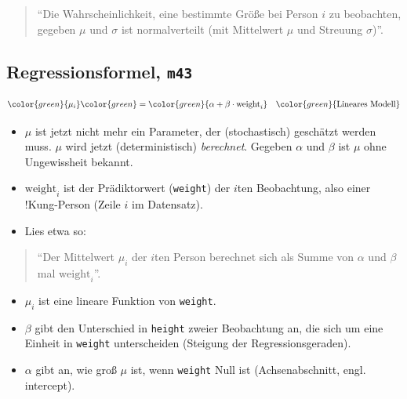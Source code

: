 \documentclass[
  a4paper,
  DIV=11]{scrreprt}
\providecommand{\tightlist}{%
  \setlength{\itemsep}{0pt}\setlength{\parskip}{0pt}}\usepackage{longtable,booktabs,array}
\theoremstyle{definition}
\theoremstyle{remark}
\begin{document}
\begin{quote}
``Die Wahrscheinlichkeit, eine bestimmte Größe bei Person \(i\) zu
beobachten, gegeben \(\mu\) und \(\sigma\) ist normalverteilt (mit
Mittelwert \(\mu\) und Streuung \(\sigma\))''.
\end{quote}

\hypertarget{regressionsformel-m43}{%
\subsection{\texorpdfstring{Regressionsformel,
\texttt{m43}}{Regressionsformel, m43}}\label{regressionsformel-m43}}

\[
\begin{aligned}
\color{green}{\mu_i} & \color{green}= \color{green}{\alpha + \beta\cdot \text{weight}_i}  && \color{green}{\text{Lineares Modell} } \\
\end{aligned}
\]

\begin{itemize}
\tightlist
\item
  \(\mu\) ist jetzt nicht mehr ein Parameter, der (stochastisch)
  geschätzt werden muss. \(\mu\) wird jetzt (deterministisch)
  \emph{berechnet}. Gegeben \(\alpha\) und \(\beta\) ist \(\mu\) ohne
  Ungewissheit bekannt.
\item
  \(\text{weight}_i\) ist der Prädiktorwert (\texttt{weight}) der
  \(i\)ten Beobachtung, also einer !Kung-Person (Zeile \(i\) im
  Datensatz).
\item
  Lies etwa so:
\end{itemize}

\begin{quote}
``Der Mittelwert \(\mu_i\) der \(i\)ten Person berechnet sich als Summe
von \(\alpha\) und \(\beta\) mal \(\text{weight}_i\)''.
\end{quote}

\begin{itemize}
\tightlist
\item
  \(\mu_i\) ist eine lineare Funktion von \texttt{weight}.
\item
  \(\beta\) gibt den Unterschied in \texttt{height} zweier Beobachtung
  an, die sich um eine Einheit in \texttt{weight} unterscheiden
  (Steigung der Regressionsgeraden).
\item
  \(\alpha\) gibt an, wie groß \(\mu\) ist, wenn \texttt{weight} Null
  ist (Achsenabschnitt, engl. intercept).
\end{itemize}
\end{document}
